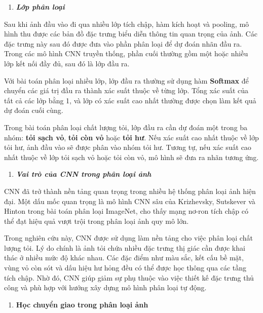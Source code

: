 \documentclass[
]{article}
\begin{document}
\begin{enumerate}
\def\labelenumi{\arabic{enumi}.}
\setcounter{enumi}{2}
\item
  \protect{}\label{_Toc232112009}{}\emph{\textbf{Lớp phân
  loại}}
\end{enumerate}

Sau khi ảnh đầu vào đi qua nhiều lớp tích chập, hàm kích hoạt và
pooling, mô hình thu được các bản đồ đặc trưng biểu diễn thông tin quan
trọng của ảnh. Các đặc trưng này sau đó được đưa vào phần phân loại để
dự đoán nhãn đầu ra. Trong các mô hình CNN truyền thống, phần cuối
thường gồm một hoặc nhiều lớp kết nối đầy đủ, sau đó là lớp đầu ra.

Với bài toán phân loại nhiều lớp, lớp đầu ra thường sử dụng hàm
\textbf{Softmax} để chuyển các giá trị đầu ra thành xác suất thuộc về
từng lớp. Tổng xác suất của tất cả các lớp bằng 1, và lớp có xác suất
cao nhất thường được chọn làm kết quả dự đoán cuối cùng.

Trong bài toán phân loại chất lượng tỏi, lớp đầu ra cần dự đoán một
trong ba nhóm: \textbf{tỏi sạch vỏ}, \textbf{tỏi còn vỏ} hoặc
\textbf{tỏi hư}. Nếu xác suất cao nhất thuộc về lớp tỏi hư, ảnh đầu vào
sẽ được phân vào nhóm tỏi hư. Tương tự, nếu xác suất cao nhất thuộc về
lớp tỏi sạch vỏ hoặc tỏi còn vỏ, mô hình sẽ đưa ra nhãn tương ứng.

\begin{enumerate}
\def\labelenumi{\arabic{enumi}.}
\setcounter{enumi}{3}
\item
  \protect{}\label{_Toc232112010}{}\emph{\textbf{Vai trò
  của CNN trong phân loại ảnh}}
\end{enumerate}

CNN đã trở thành nền tảng quan trọng trong nhiều hệ thống phân loại ảnh
hiện đại. Một dấu mốc quan trọng là mô hình CNN sâu của Krizhevsky,
Sutskever và Hinton trong bài toán phân loại ImageNet, cho thấy mạng
nơ-ron tích chập có thể đạt hiệu quả vượt trội trong phân loại ảnh quy
mô lớn.

Trong nghiên cứu này, CNN được sử dụng làm nền tảng cho việc phân loại
chất lượng tỏi. Lý do chính là ảnh tỏi chứa nhiều đặc trưng thị giác cần
được khai thác ở nhiều mức độ khác nhau. Các đặc điểm như màu sắc, kết
cấu bề mặt, vùng vỏ còn sót và dấu hiệu hư hỏng đều có thể được học
thông qua các tầng tích chập. Nhờ đó, CNN giúp giảm sự phụ thuộc vào
việc thiết kế đặc trưng thủ công và phù hợp với hướng xây dựng mô hình
phân loại tự động.

\begin{enumerate}
\def\labelenumi{\arabic{enumi}.}
\setcounter{enumi}{4}
\item
  \protect{}\label{_Toc232112011}{}\textbf{Học chuyển giao
  trong phân loại ảnh}
\end{enumerate}
\end{document}
